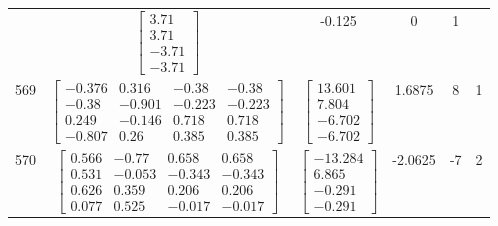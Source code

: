 \documentclass[a4paper,12pt]{article}
\begin{document}
\begin{tabular}{c c c c c c}
&
$\begin{bmatrix} 3.71 \\ 3.71 \\ -3.71 \\ -3.71 \end{bmatrix}$
&
-0.125
&
0
&
1
\\
569
&
$\begin{bmatrix} -0.376 & 0.316 & -0.38 & -0.38 \\ -0.38 & -0.901 & -0.223 & -0.223 \\ 0.249 & -0.146 & 0.718 & 0.718 \\ -0.807 & 0.26 & 0.385 & 0.385 \end{bmatrix}$
&
$\begin{bmatrix} 13.601 \\ 7.804 \\ -6.702 \\ -6.702 \end{bmatrix}$
&
1.6875
&
8
&
1
\\
570
&
$\begin{bmatrix} 0.566 & -0.77 & 0.658 & 0.658 \\ 0.531 & -0.053 & -0.343 & -0.343 \\ 0.626 & 0.359 & 0.206 & 0.206 \\ 0.077 & 0.525 & -0.017 & -0.017 \end{bmatrix}$
&
$\begin{bmatrix} -13.284 \\ 6.865 \\ -0.291 \\ -0.291 \end{bmatrix}$
&
-2.0625
&
-7
&
2
\\
\end{tabular} \egroup \newpage
\end{document}
